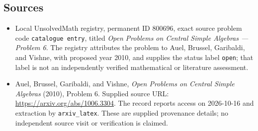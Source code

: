 \documentclass[11pt]{article}
\begin{document}
\subsection{Sources}
\begin{itemize}
\item Local UnsolvedMath registry, permanent ID \(800696\), exact source problem code \texttt{catalogue entry}, titled \emph{Open Problems on Central Simple Algebras --- Problem 6}. The registry attributes the problem to Auel, Brussel, Garibaldi, and Vishne, with proposed year 2010, and supplies the status label \texttt{open}; that label is not an independently verified mathematical or literature assessment.
\item Auel, Brussel, Garibaldi, and Vishne, \emph{Open Problems on Central Simple Algebras} (2010), Problem 6. Supplied source URL: \url{https://arxiv.org/abs/1006.3304}. The record reports access on 2026-10-16 and extraction by \texttt{arxiv\_latex}. These are supplied provenance details; no independent source visit or verification is claimed.
\end{itemize}
\end{document}
